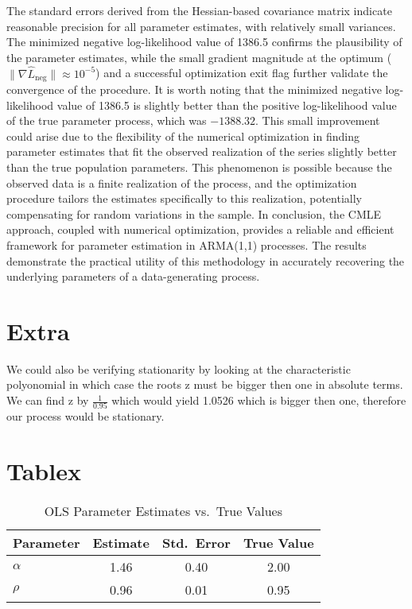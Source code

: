 \documentclass[a4paper,12pt]{article}
\begin{document}
The standard errors derived from the Hessian-based covariance matrix indicate reasonable precision for all parameter estimates, with relatively small variances. The minimized negative log-likelihood value of 1386.5 confirms the plausibility of the parameter estimates, while the small gradient magnitude at the optimum (\(\|\nabla \hat{L}_{\text{neg}}\| \approx 10^{-5}\)) and a successful optimization exit flag further validate the convergence of the procedure. It is worth noting that the minimized negative log-likelihood value of 1386.5 is slightly better than the positive log-likelihood value of the true parameter process, which was \(-1388.32\). This small improvement could arise due to the flexibility of the numerical optimization in finding parameter estimates that fit the observed realization of the series slightly better than the true population parameters. This phenomenon is possible because the observed data is a finite realization of the process, and the optimization procedure tailors the estimates specifically to this realization, potentially compensating for random variations in the sample.
In conclusion, the CMLE approach, coupled with numerical optimization, provides a reliable and efficient framework for parameter estimation in ARMA(1,1) processes. The results demonstrate the practical utility of this methodology in accurately recovering the underlying parameters of a data-generating process.






















\section{Extra}
We could also be verifying stationarity by looking at the characteristic polyonomial in which case the roots z must be bigger then one in absolute terms. We can find z by $\frac{1}{0.95}$ which would yield 1.0526 which is bigger then one, therefore our process would be stationary.



\section{Tablex}
\begin{table}[ht]
    \centering
    \caption{OLS Parameter Estimates vs.\ True Values}
    \label{tab:ols-results}
    \begin{tabular}{lccc}
        \hline
        \textbf{Parameter} & \textbf{Estimate} & \textbf{Std.\ Error} & \textbf{True Value} \\
        \hline
        $\alpha$ & 1.46 & 0.40 & 2.00 \\
        $\rho$   & 0.96 & 0.01 & 0.95 \\
        \hline
    \end{tabular}
\end{table}
\end{document}
